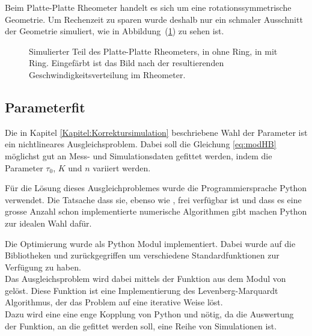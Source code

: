 Beim Platte-Platte Rheometer handelt es sich um eine rotationssymmetrische Geometrie. Um Rechenzeit zu sparen wurde deshalb nur ein schmaler Ausschnitt der Geometrie simuliert, wie in Abbildung~(\ref{fig:plattePlatteRheoSim}) zu sehen ist.\\
\begin{figure}
\centering
{}
\caption{Simulierter Teil des Platte-Platte Rheometers, in  ohne Ring, in  mit Ring.
Eingefärbt ist das Bild nach der resultierenden Geschwindigkeitsverteilung im Rheometer.}
\label{fig:plattePlatteRheoSim}
\end{figure}
%
\subsection{Parameterfit}
Die in Kapitel \ref{Kapitel:Korrektursimulation} beschriebene Wahl der Parameter ist ein nichtlineares Ausgleichsproblem. Dabei soll die Gleichung \eqref{eq:modHB} möglichst gut an Mess- und Simulationsdaten gefittet werden, indem die Parameter $\tau_0$, $K$ und $n$ variiert werden.

Für die Lösung dieses Ausgleichproblemes wurde die Programmiersprache Python verwendet. Die Tatsache dass sie, ebenso wie \openfoam{}, frei verfügbar ist und dass es eine grosse Anzahl schon implementierte numerische Algorithmen gibt machen Python zur idealen Wahl dafür.

Die Optimierung wurde als Python Modul  implementiert. Dabei wurde auf die Bibliotheken  und  \cite{scipy} zurückgegriffen um verschiedene Standardfunktionen zur Verfügung zu haben.\\
Das Ausgleichsproblem wird dabei mittels der Funktion  aus dem Modul  von  gelöst.
Diese Funktion ist eine Implementierung des Levenberg-Marquardt Algorithmus, der das Problem auf eine iterative Weise löst.\\
Dazu wird eine eine enge Kopplung von Python und \openfoam{} nötig, da die Auswertung der Funktion, an die gefittet werden soll, eine Reihe von Simulationen ist.

